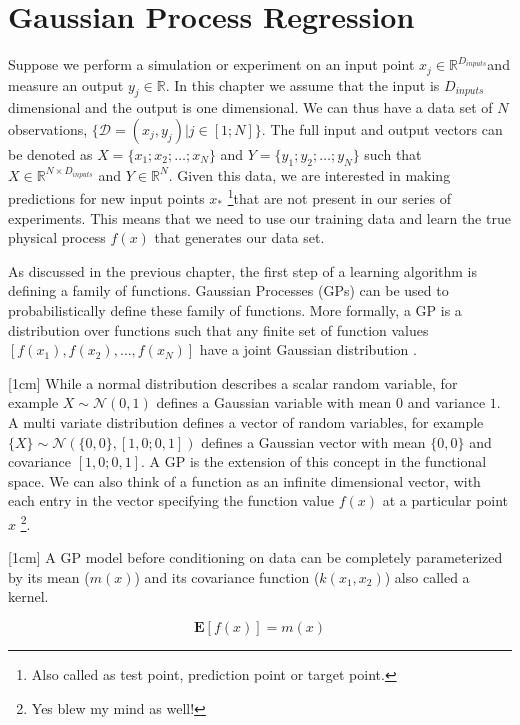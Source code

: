 \chapter{Gaussian Process Regression}
\label{chapGp}
Suppose we perform a simulation or experiment on an input point $x_{j} \in \mathbb{R}^{D_{inputs}}$and measure an output $y_{j} \in \mathbb{R}$. In this chapter we assume that the input is $D_{inputs}$ dimensional and the output is one dimensional. We can thus have a data set of $N$ observations, $\{\mathcal{D} = (x_{j}, y_{j}) | j \in [1; N] \}$. The full input and output vectors can be denoted as $X = \{x_{1}; x_{2}; \ldots ; x_{N}\}$ and $Y = \{y_{1}; y_{2}; \ldots ; y_{N}\}$ such that $X \in \mathbb{R}^{N \times D_{inputs}}$ and $Y \in \mathbb{R}^{N }$. Given this data, we are interested in making predictions for new input points $x_{*}$ \footnote{Also called as test point, prediction point or target point.}that are not present in our series of experiments. This means that we need to use our training data and learn the true physical process  $f(x)$ that generates our data set.

As discussed in the previous chapter, the first step of a learning algorithm is defining a family of functions. Gaussian Processes (GPs) can be used to probabilistically define these family of functions. More formally, a GP is a distribution over functions such that any finite set of function values $[f(x_{1}), f(x_{2}), \ldots, f(x_{N})]$ have a joint Gaussian distribution \cite{rasmussen2006gaussian}. 

[1cm]
While a normal distribution describes a scalar random variable, for example $X \sim \mathcal{N}(0, 1)$ defines a Gaussian variable with mean $0$ and variance $1$. A multi variate distribution defines a vector of random variables, for example $\{X\} \sim \mathcal{N}(\{0, 0\}, [1, 0; 0, 1])$ defines a Gaussian vector with mean $\{0, 0\}$ and covariance $[1, 0; 0, 1]$. A GP is the extension of this concept in the functional space. We can also think of a function as an infinite dimensional vector, with each entry in the vector specifying the function value $f(x)$ at a particular point $x$ \footnote{Yes blew my mind as well!}. 

[1cm]
A GP model before conditioning on data can be completely parameterized by its mean ($m(x)$) and its covariance function ($k(x_{1}, x_{2})$) also called a kernel. 

\begin{equation}\label{eq:meanGP}
\mathbf{E}[f(x)] = m(x)
\end{equation}

